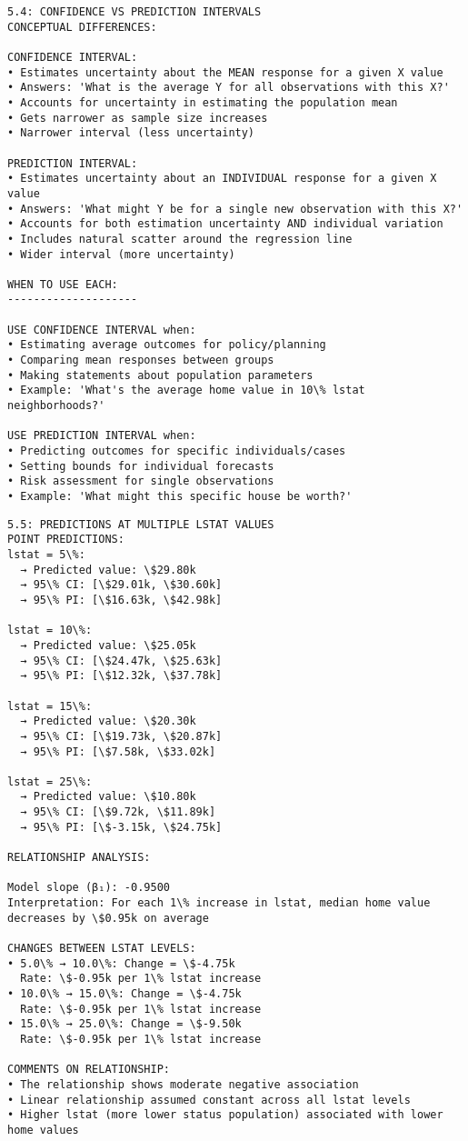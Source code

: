 \documentclass[8pt, twocolumn]{extarticle}
\begin{document}
    \begin{Verbatim}[commandchars=\\\{\}]
5.4: CONFIDENCE VS PREDICTION INTERVALS
CONCEPTUAL DIFFERENCES:

CONFIDENCE INTERVAL:
• Estimates uncertainty about the MEAN response for a given X value
• Answers: 'What is the average Y for all observations with this X?'
• Accounts for uncertainty in estimating the population mean
• Gets narrower as sample size increases
• Narrower interval (less uncertainty)

PREDICTION INTERVAL:
• Estimates uncertainty about an INDIVIDUAL response for a given X value
• Answers: 'What might Y be for a single new observation with this X?'
• Accounts for both estimation uncertainty AND individual variation
• Includes natural scatter around the regression line
• Wider interval (more uncertainty)

WHEN TO USE EACH:
--------------------

USE CONFIDENCE INTERVAL when:
• Estimating average outcomes for policy/planning
• Comparing mean responses between groups
• Making statements about population parameters
• Example: 'What's the average home value in 10\% lstat neighborhoods?'

USE PREDICTION INTERVAL when:
• Predicting outcomes for specific individuals/cases
• Setting bounds for individual forecasts
• Risk assessment for single observations
• Example: 'What might this specific house be worth?'

    \end{Verbatim}

    \begin{Verbatim}[commandchars=\\\{\}]
5.5: PREDICTIONS AT MULTIPLE LSTAT VALUES
POINT PREDICTIONS:
lstat = 5\%:
  → Predicted value: \$29.80k
  → 95\% CI: [\$29.01k, \$30.60k]
  → 95\% PI: [\$16.63k, \$42.98k]

lstat = 10\%:
  → Predicted value: \$25.05k
  → 95\% CI: [\$24.47k, \$25.63k]
  → 95\% PI: [\$12.32k, \$37.78k]

lstat = 15\%:
  → Predicted value: \$20.30k
  → 95\% CI: [\$19.73k, \$20.87k]
  → 95\% PI: [\$7.58k, \$33.02k]

lstat = 25\%:
  → Predicted value: \$10.80k
  → 95\% CI: [\$9.72k, \$11.89k]
  → 95\% PI: [\$-3.15k, \$24.75k]

RELATIONSHIP ANALYSIS:

Model slope (β₁): -0.9500
Interpretation: For each 1\% increase in lstat, median home value
decreases by \$0.95k on average

CHANGES BETWEEN LSTAT LEVELS:
• 5.0\% → 10.0\%: Change = \$-4.75k
  Rate: \$-0.95k per 1\% lstat increase
• 10.0\% → 15.0\%: Change = \$-4.75k
  Rate: \$-0.95k per 1\% lstat increase
• 15.0\% → 25.0\%: Change = \$-9.50k
  Rate: \$-0.95k per 1\% lstat increase

COMMENTS ON RELATIONSHIP:
• The relationship shows moderate negative association
• Linear relationship assumed constant across all lstat levels
• Higher lstat (more lower status population) associated with lower home values
    \end{Verbatim}
\end{document}
